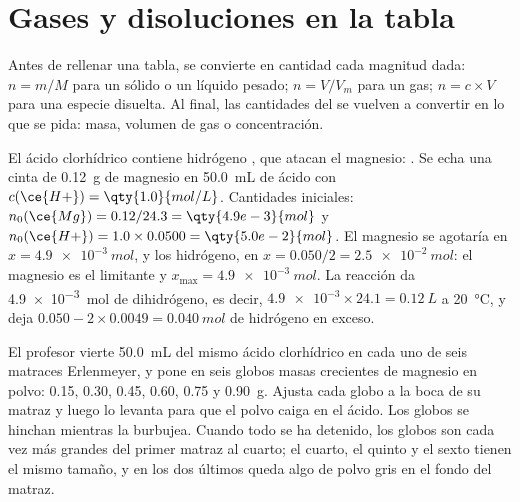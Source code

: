 \section{Gases y disoluciones en la tabla}


\begin{method}\label{met:g10:reaction-progress-table:amounts}
Antes de rellenar una tabla, se convierte en cantidad cada magnitud
dada: $n = m/M$ para un sólido o un líquido pesado; $n = V/V_m$ para un
gas; $n = c \times V$ para una especie disuelta. Al final, las
cantidades del  se vuelven a convertir en lo que se pida:
masa, volumen de gas o concentración.
\end{method}

\begin{example}\label{ex:g10:reaction-progress-table:magnesium}
El ácido clorhídrico contiene  hidrógeno , que atacan el
magnesio: . Se echa una cinta de
\qty{0.12}{g} de magnesio en \qty{50.0}{mL} de ácido con
$c(\ce{H+}) = \qty{1.0}{mol/L}$. Cantidades iniciales:
$n_0(\ce{Mg}) = 0.12/24.3 = \qty{4.9e-3}{mol}$ y
$n_0(\ce{H+}) = 1.0 \times 0.0500 = \qty{5.0e-2}{mol}$. El magnesio se
agotaría en $x = \qty{4.9e-3}{mol}$, y los  hidrógeno, en
$x = 0.050/2 = \qty{2.5e-2}{mol}$: el magnesio es el limitante y
$x_{\max} = \qty{4.9e-3}{mol}$. La reacción da \qty{4.9e-3}{mol} de
dihidrógeno, es decir, $\num{4.9e-3} \times 24.1 = \qty{0.12}{L}$ a
\qty{20}{\celsius}, y deja $0.050 - 2 \times 0.0049 =
\qty{0.040}{mol}$ de  hidrógeno en exceso.
\end{example}

\begin{inthelab}
El profesor vierte \qty{50.0}{mL} del mismo ácido clorhídrico en cada
uno de seis matraces Erlenmeyer, y pone en seis globos masas crecientes
de magnesio en polvo: 0.15, 0.30, 0.45, 0.60, 0.75 y \qty{0.90}{g}.
Ajusta cada globo a la boca de su matraz y luego lo levanta para que el
polvo caiga en el ácido. Los globos se hinchan mientras la 
burbujea. Cuando todo se ha detenido, los globos son cada vez más
grandes del primer matraz al cuarto; el cuarto, el quinto y el sexto
tienen el mismo tamaño, y en los dos últimos queda algo de polvo gris en
el fondo del matraz.
\end{inthelab}

